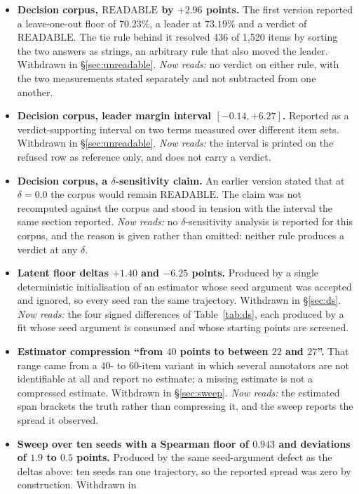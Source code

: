 \documentclass{article}
\begin{document}
\begin{itemize}
\item \textbf{Decision corpus, $\mathrm{READABLE}$ by $+2.96$ points.} The first
version reported a leave-one-out floor of $70.23\%$, a leader at $73.19\%$ and a
verdict of $\mathrm{READABLE}$. The tie rule behind it resolved 436 of 1,520
items by sorting the two answers as strings, an arbitrary rule that also moved
the leader. Withdrawn in \S\ref{sec:unreadable}. \emph{Now reads:} no verdict on either rule, with the two
measurements stated separately and not subtracted from one another.
\item \textbf{Decision corpus, leader margin interval $[-0.14,+6.27]$.} Reported
as a verdict-supporting interval on two terms measured over different item sets.
Withdrawn in \S\ref{sec:unreadable}. \emph{Now reads:} the interval is printed on the refused row as reference
only, and does not carry a verdict.
\item \textbf{Decision corpus, a $\delta$-sensitivity claim.} An earlier version
stated that at $\delta=0.0$ the corpus would remain $\mathrm{READABLE}$. The
claim was not recomputed against the corpus and stood in tension with the
interval the same section reported. \emph{Now reads:} no $\delta$-sensitivity analysis is reported for this
corpus, and the reason is given rather than omitted: neither rule produces a verdict at any $\delta$.
\item \textbf{Latent floor deltas $+1.40$ and $-6.25$ points.} Produced by a
single deterministic initialisation of an estimator whose seed argument was
accepted and ignored, so every seed ran the same trajectory. Withdrawn in
\S\ref{sec:ds}. \emph{Now reads:} the four signed differences of Table~\ref{tab:ds}, each produced by a fit
whose seed argument is consumed and whose starting points are screened.
\item \textbf{Estimator compression ``from $40$ points to between $22$ and
$27$''.} That range came from a 40- to 60-item variant in which several
annotators are not identifiable at all and report no estimate; a missing estimate
is not a compressed estimate. Withdrawn in \S\ref{sec:sweep}. \emph{Now reads:} the estimated span brackets the
truth rather than compressing it, and the sweep reports the spread it observed.
\item \textbf{Sweep over ten seeds with a Spearman floor of $0.943$ and
deviations of $1.9$ to $0.5$ points.} Produced by
the same seed-argument defect as the deltas above: ten seeds ran one trajectory,
so the reported spread was zero by construction. Withdrawn in

\end{itemize}
\end{document}
